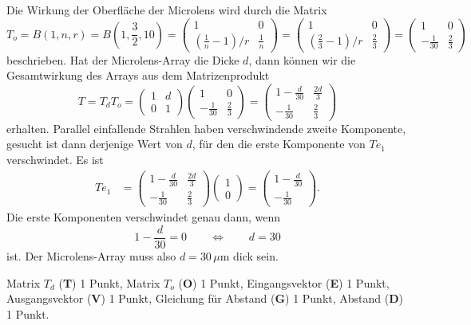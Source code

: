 \begin{loesung}
Die Wirkung der Oberfläche der Microlens wird durch die Matrix
\[
T_o
=
B(1,n,r)
=
B(1,{\textstyle\frac32},10)
=
\begin{pmatrix}1&0\\(\frac{1}{n}-1)/r&\frac1n\end{pmatrix}
=
\begin{pmatrix}1&0\\(\frac{2}{3}-1)/r&\frac23\end{pmatrix}
=
\begin{pmatrix}1&0\\-\frac{1}{30}&\frac23\end{pmatrix}
\]
beschrieben.
Hat der Microlens-Array die Dicke $d$, dann können wir die Gesamtwirkung
des Arrays aus dem Matrizenprodukt
\[
T
=
T_d
T_o
=
\begin{pmatrix}1&d\\0&1\end{pmatrix}
\begin{pmatrix}1&0\\-\frac{1}{30}&\frac23\end{pmatrix}
=
\begin{pmatrix}
1-\frac{d}{30} & \frac{2d}{3} \\
-\frac1{30} & \frac23
\end{pmatrix}
\]
erhalten.
Parallel einfallende Strahlen haben verschwindende zweite Komponente,
gesucht ist dann derjenige Wert von $d$, für den die erste Komponente
von $Te_1$ verschwindet.
Es ist
\begin{align*}
Te_1
&=
\begin{pmatrix}
1-\frac{d}{30} & \frac{2d}{3} \\
-\frac1{30} & \frac23
\end{pmatrix}
\begin{pmatrix}1\\0\end{pmatrix}
=
\begin{pmatrix}
1-\frac{d}{30} \\
-\frac1{30} 
\end{pmatrix}.
\end{align*}
Die erste Komponenten verschwindet genau dann, wenn 
\[
1-\frac{d}{30} = 0
\qquad\Leftrightarrow\qquad
d=30
\]
ist.
Der Microlens-Array muss also $d=30\,\mu\text{m}$ dick sein.
\end{loesung}

\begin{bewertung}
Matrix $T_d$ ({\bf T}) 1 Punkt,
Matrix $T_o$ ({\bf O}) 1 Punkt,
Eingangsvektor ({\bf E}) 1 Punkt,
Ausgangsvektor ({\bf V}) 1 Punkt,
Gleichung für Abstand ({\bf G}) 1 Punkt,
Abstand ({\bf D}) 1 Punkt.
\end{bewertung}
